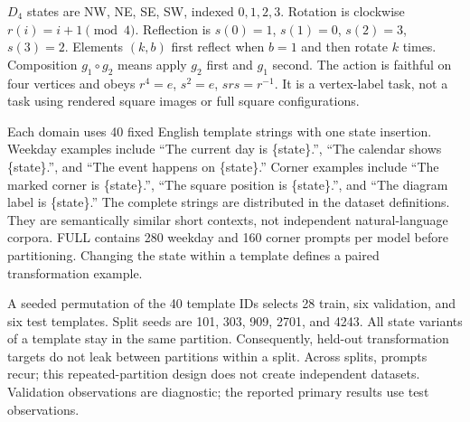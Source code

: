 $D_4$ states are NW, NE, SE, SW, indexed $0,1,2,3$. Rotation is clockwise $r(i)=i+1\pmod4$. Reflection is $s(0)=1$, $s(1)=0$, $s(2)=3$, $s(3)=2$. Elements $(k,b)$ first reflect when $b=1$ and then rotate $k$ times. Composition $g_1\circ g_2$ means apply $g_2$ first and $g_1$ second. The action is faithful on four vertices and obeys $r^4=e$, $s^2=e$, $srs=r^{-1}$. It is a vertex-label task, not a task using rendered square images or full square configurations.

Each domain uses 40 fixed English template strings with one state insertion. Weekday examples include ``The current day is \{state\}.'', ``The calendar shows \{state\}.'', and ``The event happens on \{state\}.'' Corner examples include ``The marked corner is \{state\}.'', ``The square position is \{state\}.'', and ``The diagram label is \{state\}.'' The complete strings are distributed in the dataset definitions. They are semantically similar short contexts, not independent natural-language corpora. FULL contains 280 weekday and 160 corner prompts per model before partitioning. Changing the state within a template defines a paired transformation example.

A seeded permutation of the 40 template IDs selects 28 train, six validation, and six test templates. Split seeds are 101, 303, 909, 2701, and 4243. All state variants of a template stay in the same partition. Consequently, held-out transformation targets do not leak between partitions within a split. Across splits, prompts recur; this repeated-partition design does not create independent datasets. Validation observations are diagnostic; the reported primary results use test observations.

